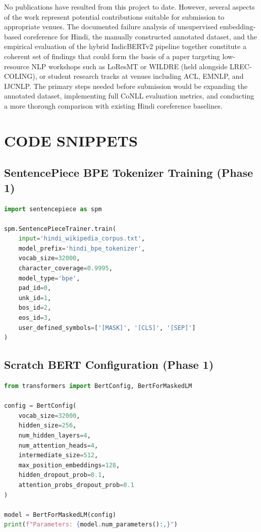 \documentclass[12pt,a4paper]{report}
\begin{document}
\noindent No publications have resulted from this project to date. However, several aspects of the work represent potential contributions suitable for submission to appropriate venues. The documented failure analysis of unsupervised embedding-based coreference for Hindi, the manually constructed annotated dataset, and the empirical evaluation of the hybrid IndicBERTv2 pipeline together constitute a coherent set of findings that could form the basis of a paper targeting low-resource NLP workshops such as LoResMT or WILDRE (held alongside LREC-COLING), or student research tracks at venues including ACL, EMNLP, and IJCNLP. The primary steps needed before submission would be expanding the annotated dataset, implementing full CoNLL evaluation metrics, and conducting a more thorough comparison with existing Hindi coreference baselines.


\appendix

\chapter{CODE SNIPPETS}

\section{SentencePiece BPE Tokenizer Training (Phase 1)}

\begin{lstlisting}[language=Python, caption={SentencePiece BPE Tokenizer Training for Hindi}]
import sentencepiece as spm

spm.SentencePieceTrainer.train(
    input='hindi_wikipedia_corpus.txt',
    model_prefix='hindi_bpe_tokenizer',
    vocab_size=32000,
    character_coverage=0.9995,
    model_type='bpe',
    pad_id=0,
    unk_id=1,
    bos_id=2,
    eos_id=3,
    user_defined_symbols=['[MASK]', '[CLS]', '[SEP]']
)
\end{lstlisting}

\section{Scratch BERT Configuration (Phase 1)}

\begin{lstlisting}[language=Python, caption={Compact BERT Configuration for Scratch Training}]
from transformers import BertConfig, BertForMaskedLM

config = BertConfig(
    vocab_size=32000,
    hidden_size=256,
    num_hidden_layers=4,
    num_attention_heads=4,
    intermediate_size=512,
    max_position_embeddings=128,
    hidden_dropout_prob=0.1,
    attention_probs_dropout_prob=0.1
)

model = BertForMaskedLM(config)
print(f"Parameters: {model.num_parameters():,}")
\end{lstlisting}
\end{document}
